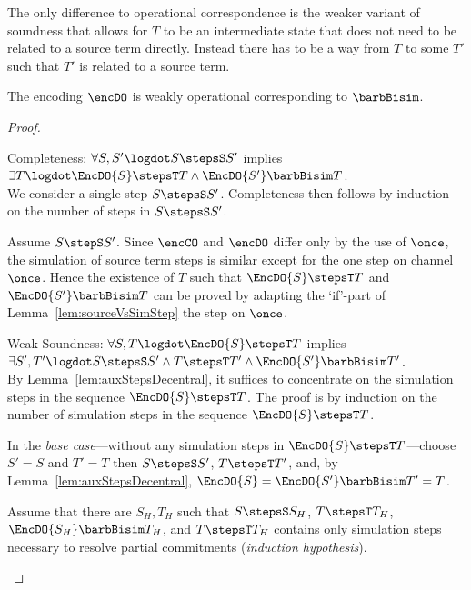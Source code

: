 \documentclass[]{eptcs}
\begin{document}
The only difference to operational correspondence is the weaker variant of soundness that allows for $ T $ to be an intermediate state that does not need to be related to a source term directly. Instead there has to be a way from $ T $ to some $ T' $ such that $ T' $ is related to a source term.

\begin{theorem}
	The encoding $ \encDO $ is weakly operational corresponding \wrt to $ \barbBisim $.
	\label{thm:operationalCorrespondenceDecentral}
\end{theorem}

\begin{proof}
	\begin{compactitem}
		\item[Completeness:] $ \forall S, S' \logdot S \stepsS S' $ implies $ \exists T \logdot \EncDO{S} \stepsT T \wedge \EncDO{S'} \barbBisim T $.\\
			We consider a single step $ S \stepsS S' $. Completeness then follows by induction on the number of steps in $ S \stepsS S' $.
			
			Assume $ S \stepS S' $. Since $ \encCO $ and $ \encDO $ differ only by the use of $ \once $, the simulation of source term steps is similar except for the one step on channel $ \once $. Hence the existence of $ T $ such that $ \EncDO{S} \stepsT T $ and $ \EncDO{S'} \barbBisim T $ can be proved by adapting the `if'-part of Lemma~\ref{lem:sourceVsSimStep} \wrt the step on $ \once $.
		\item[Weak Soundness:] $ \forall S, T \logdot \EncDO{S} \stepsT T $ implies $ \exists S', T' \logdot S \stepsS S' \wedge T \stepsT T' \wedge \EncDO{S'} \barbBisim T' $.\\
			By Lemma~\ref{lem:auxStepsDecentral}, it suffices to concentrate on the simulation steps in the sequence $ \EncDO{S} \stepsT T $. The proof is by induction on the number of simulation steps in the sequence $ \EncDO{S} \stepsT T $.
			
			In the \emph{base case}---without any simulation steps in $ \EncDO{S} \stepsT T $---choose $ S' = S $ and $ T' = T $ then $ S \stepsS S' $, $ T \stepsT T' $, and, by Lemma~\ref{lem:auxStepsDecentral}, $ \EncDO{S} = \EncDO{S'} \barbBisim T' = T $.
			
			Assume that there are $ S_H, T_H $ such that $ S \stepsS S_H $, $ T \stepsT T_H $, $ \EncDO{S_H} \barbBisim T_H $, and $ T \stepsT T_H $ contains only simulation steps necessary to resolve partial commitments (\emph{induction hypothesis}).
			

\end{compactitem}
\end{proof}
\end{document}
